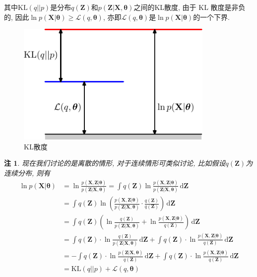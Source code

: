 \documentclass[a4paper,UTF8]{ctexart}
\theoremstyle{plain} \newtheorem{theorem}{定理}[section]
\theoremstyle{plain} \newtheorem{definition}{定义}[section]
\theoremstyle{plain} \newtheorem{lemma}{引理}[section]
\theoremstyle{plain} \newtheorem{proposition}{命题}[section]
\theoremstyle{plain} \newtheorem{example}{例}
\theoremstyle{plain} \newtheorem{remark}{注}
\theoremstyle{plain} \newtheorem{corollary}{推论}[section]
\newcommand\diff{\,{\mathrm d}} %
\begin{document}
其中$\mathrm{KL}(q || p)$是分布$q(\bm{Z})$和$p(\bm{Z} | \bm{X}, \bm{\theta})$之间的KL散度, 由于 KL 散度是非负的, 因此$\ln p(\bm{X} | \bm{\theta}) \geqslant  \mathcal{L}(q, \bm{\theta})$, 亦即$\mathcal{L}(q, \bm{\theta})$是$\ln p(\bm{X} | \bm{\theta})$的一个下界.

\begin{figure}[!htb]
	\centering
	\includegraphics[width=0.85\textwidth]{kld1.pdf}
	\caption{KL散度}
	\label{kld1}
\end{figure}


\begin{remark}
现在我们讨论的是离散的情形, 对于连续情形可类似讨论, 比如假设$q(\bm{Z})$为连续分布, 则有
\begin{align*}
\ln p(\bm{X} | \bm{\theta}) & = \ln \frac{p(\bm{X}, \bm{Z} | \bm{\theta})}{p(\bm{Z} | \bm{X}, \bm{\theta})}  = \int q(\bm{Z}) \ln \frac{p(\bm{X}, \bm{Z} | \bm{\theta})}{p(\bm{Z} | \bm{X}, \bm{\theta})} \diff \bm{Z} \\
& = \int q(\bm{Z}) \ln \left( \frac{p(\bm{X}, \bm{Z} | \bm{\theta})}{p(\bm{Z} | \bm{X}, \bm{\theta})} \cdot \frac{q(\bm{Z})}{q(\bm{Z})} \right) \diff \bm{Z} \\
& = \int q(\bm{Z}) \left( \ln \frac{q(\bm{Z})}{p(\bm{Z} | \bm{X}, \bm{\theta})} + \ln \frac{p(\bm{X}, \bm{Z} | \bm{\theta})}{q(\bm{Z})} \right) \diff \bm{Z} \\
& = \int q(\bm{Z}) \cdot \ln \frac{q(\bm{Z})}{p(\bm{Z} | \bm{X}, \bm{\theta})} \diff \bm{Z} + \int q(\bm{Z}) \cdot \ln \frac{p(\bm{X}, \bm{Z} | \bm{\theta})}{q(\bm{Z})} \diff \bm{Z} \\
& = - \int q(\bm{Z}) \cdot \ln \frac{p(\bm{Z} | \bm{X}, \bm{\theta})}{q(\bm{Z})} \diff \bm{Z} + \int q(\bm{Z}) \cdot \ln \frac{p(\bm{X}, \bm{Z} | \bm{\theta})}{q(\bm{Z})} \diff \bm{Z} \\
& = \mathrm{KL}(q||p) +  \mathcal{L}(q,\bm{\theta})
\end{align*}

\end{remark}
\end{document}
